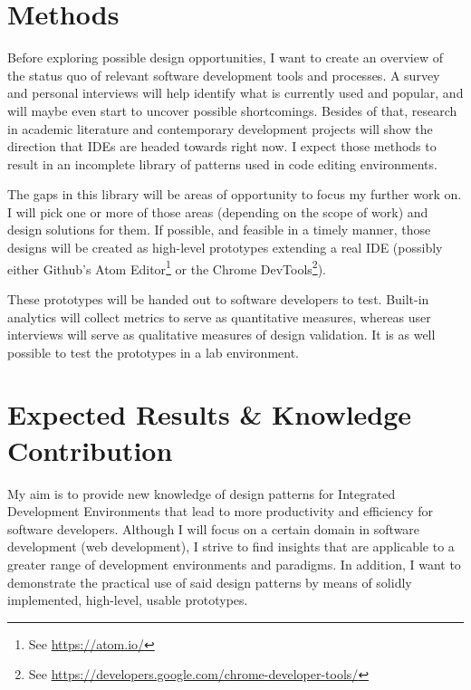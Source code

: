 \documentclass{scrartcl}
\begin{document}



\section{Methods} Before exploring possible design opportunities, I want to
create an overview of the status quo of relevant software development tools and
processes. A survey and personal interviews will help identify what is currently
used and popular, and will maybe even start to uncover possible shortcomings.
Besides of that, research in academic literature and contemporary development
projects will show the direction that IDEs are headed towards right now. I
expect those methods to result in an incomplete library of patterns used in
code editing environments.

The gaps in this library will be areas of opportunity to focus my further work
on. I will pick one or more of those areas (depending on the scope of work) and
design solutions for them. If possible, and feasible in a timely manner, those
designs will be created as high-level prototypes extending a real IDE (possibly
either Github’s Atom Editor\footnote{See \url{https://atom.io/}} or the Chrome DevTools\footnote{See \url{https://developers.google.com/chrome-developer-tools/}}).

These prototypes will be handed out to software developers to test. Built-in
analytics will collect metrics to serve as quantitative measures, whereas user
interviews will serve as qualitative measures of design validation. It is as
well possible to test the prototypes in a lab environment.

\section{Expected Results \& Knowledge Contribution} My aim is to provide new
knowledge of design patterns for Integrated Development Environments that lead
to more productivity and efficiency for software developers. Although I will
focus on a certain domain in software development (web development), I strive to
find insights that are applicable to a greater range of development environments
and paradigms. In addition, I want to demonstrate the practical use of said
design patterns by means of solidly implemented, high-level, usable prototypes.
\end{document}
